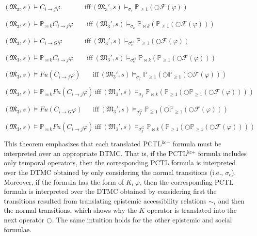 \begin{theorem}
$(\mathfrak{M_3},s)\models C_{i \rightarrow j}\varphi ~~~~~~~~~~~~~~~~\text{iff}~ (\mathfrak{M_3'},s)\models_{\sigma_c} \mathbb{P}_{\geq1}(\bigcirc\mathscr{F}(\varphi))$

$(\mathfrak{M_3},s)\models \mathbb{P}_{\bowtie k}C_{i \rightarrow j}\varphi ~~~~~~~~~\text{iff}~ (\mathfrak{M_3'},s) \models_{\sigma_c} \mathbb{P}_{\bowtie k}(\mathbb{P}_{\geq1}(\bigcirc\mathscr{F}(\varphi)))$

$(\mathfrak{M_3},s)\models C_{i \rightarrow G}\varphi ~~~~~~~~~~~~~~~\text{iff}~ (\mathfrak{M_3'},s)\models_{\sigma_c^G} \mathbb{P}_{\geq1}(\bigcirc\mathscr{F}(\varphi))$

$(\mathfrak{M_3},s)\models \mathbb{P}_{\bowtie k}C_{i \rightarrow j}\varphi ~~~~~~~~~\text{iff}~ (\mathfrak{M_3'},s) \models_{\sigma_c^G} \mathbb{P}_{\bowtie k}(\mathbb{P}_{\geq1}(\bigcirc\mathscr{F}(\varphi)))$

$(\mathfrak{M_3},s)\models Fu(C_{i \rightarrow j}\varphi) ~~~~~~~~\text{iff}~ (\mathfrak{M_3'},s) \models_{\sigma_f} \mathbb{P}_{\geq 1}(\bigcirc\mathbb{P}_{\geq 1}(\bigcirc \mathscr{F}(\varphi)))$

$(\mathfrak{M_3},s)\models \mathbb{P}_{\bowtie k}Fu(C_{i \rightarrow j}\varphi) ~\text{iff}~ (\mathfrak{M_3'},s) \models_{\sigma_f} \mathbb{P}_{\bowtie k} (\mathbb{P}_{\geq 1}(\bigcirc\mathbb{P}_{\geq 1}(\bigcirc \mathscr{F}(\varphi))))$

$(\mathfrak{M_3},s)\models Fu(C_{i \rightarrow G}\varphi) ~~~~~~~\text{iff}~ (\mathfrak{M_3'},s) \models_{\sigma_f^G} \mathbb{P}_{\geq 1}(\bigcirc\mathbb{P}_{\geq 1}(\bigcirc \mathscr{F}(\varphi)))$

$(\mathfrak{M_3},s)\models \mathbb{P}_{\bowtie k}Fu(C_{i \rightarrow j}\varphi) ~\text{iff}~ (\mathfrak{M_3'},s) \models_{\sigma_f^G} \mathbb{P}_{\bowtie k} (\mathbb{P}_{\geq 1}(\bigcirc\mathbb{P}_{\geq 1}(\bigcirc \mathscr{F}(\varphi))))$

\end{theorem}


This theorem emphasizes that each translated PCTL$^{\textrm{kc+}}$
formula must be interpreted over an appropriate DTMC. That is, if
the PCTL$^{\textrm{kc+}}$ formula includes only temporal
operators, then the corresponding PCTL formula is interpreted over
the DTMC obtained by only considering the normal transitions
(i.e., $\sigma_\epsilon$). Moreover, if the formula has the form
of $K_i~\varphi$, then the corresponding PCTL formula is
interpreted over the DTMC obtained by considering first the
transitions resulted from translating epistemic accessibility
relations $\sim_i$ and then the normal transitions, which shows
why the $K$ operator is translated into the next operator
$\bigcirc$. The same intuition holds for the other epistemic and
social formulae.


